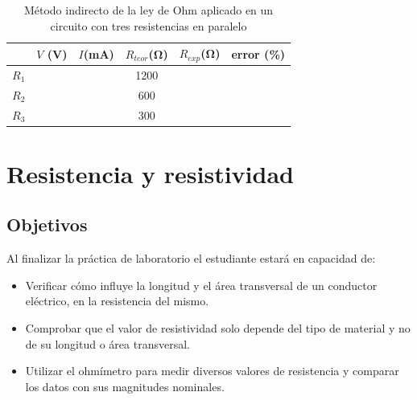 \documentclass[12pt,letterpaper]{report}
\newcommand{\obj}{Objetivos}
\begin{document}
\begin{table}[H]
	\caption{Método indirecto de la ley de Ohm aplicado en un circuito con tres resistencias en paralelo}
	\label{tab:L1T4}
	\centering
	\vspace{0.5cm}
    \begin{tabularx}{14cm}{CCCCCC}
		\toprule
		&$V$ (\si{V}) & $I$(\si{\milli\ampere}) & $R_{teor}$(\si{\ohm}) & $R_{exp}$(\si{\ohm}) & error (\%)\\
		\midrule
	    $R_1$ & & &1200 & & \\
		$R_2$ & & &600 & & \\
		$R_3$ & & &300 & & \\
		\bottomrule
	\end{tabularx}
\end{table}

\chapter{Resistencia y resistividad}
\section{\obj}
Al finalizar la práctica de laboratorio el estudiante estará en capacidad de:
\begin{itemize}
\item Verificar cómo influye la longitud y el área transversal de un conductor eléctrico, en la resistencia del mismo.
\item	Comprobar que el valor de resistividad solo depende del tipo de material y no de su longitud o área transversal.
\item	Utilizar el ohmímetro para medir diversos valores de resistencia y comparar los datos con sus magnitudes nominales.
\end{itemize}
\end{document}
